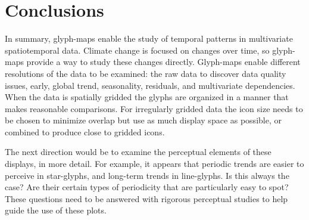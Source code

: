 \documentclass[oneside]{article}
\begin{document}
\section{Conclusions}

In summary, glyph-maps enable the study of temporal patterns in multivariate spatiotemporal data. Climate change is focused on changes over time, so glyph-maps provide a way to study these changes directly. Glyph-maps enable different resolutions of the data to be examined: the raw data to discover data quality issues, early, global trend, seasonality, residuals, and multivariate dependencies. When the data is spatially gridded the glyphs are organized in a manner that makes reasonable comparisons. For irregularly gridded data the icon size needs to be chosen to minimize overlap but use as much display space as possible, or combined to produce close to gridded icons. 

The next direction would be to examine the perceptual elements of these displays, in more detail. For example, it appears that periodic trends are easier to perceive in star-glyphs, and long-term trends in line-glyphs. Is this always the case? Are their certain types of periodicity that are particularly easy to spot? These questions need to be answered with rigorous perceptual studies to help guide the use of these plots.




\end{document}
